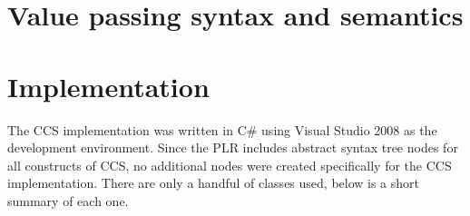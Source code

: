 \section{Value passing syntax and semantics}\label{ccs_value_syntax}

\section{Implementation}

	The CCS implementation was written in C\# using Visual Studio 2008 as the 
	development environment. Since the PLR includes abstract syntax tree nodes 
	for all constructs of CCS, no additional nodes were created specifically for 
	the CCS implementation. There are only a handful of classes used, below is a 
	short summary of each one.


